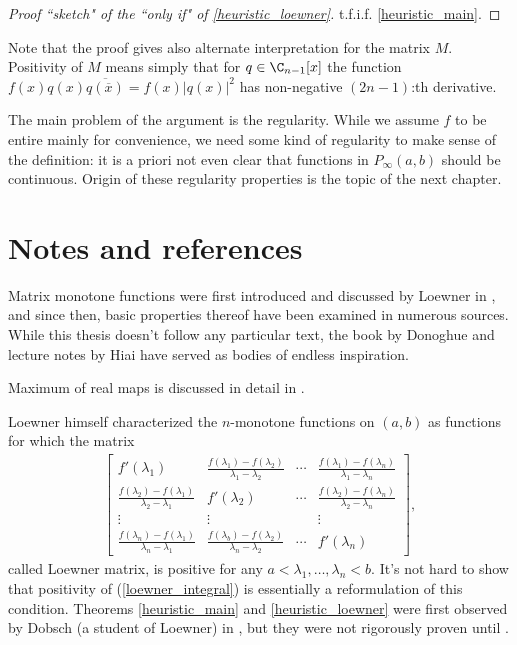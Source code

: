 \begin{proof}[Proof ``sketch" of the ``only if" of \ref{heuristic_loewner}]
	t.f.i.f. \ref{heuristic_main}.
\end{proof}

Note that the proof gives also alternate interpretation for the matrix $M$. Positivity of $M$ means simply that for $q \in \C_{n - 1}[x]$ the function $f(x) q(x) \overline{q(\overline{x})} = f(x) |q(x)|^2$ has non-negative $(2 n - 1)$:th derivative.

The main problem of the argument is the regularity. While we assume $f$ to be entire mainly for convenience, we need some kind of regularity to make sense of the definition: it is a priori not even clear that functions in $P_{\infty}(a, b)$ should be continuous. Origin of these regularity properties is the topic of the next chapter.

\section{Notes and references}

Matrix monotone functions were first introduced and discussed by Loewner in \cite{Low}, and since then, basic properties thereof have been examined in numerous sources. While this thesis doesn't follow any particular text, the book by Donoghue \cite{Don} and lecture notes by Hiai \cite{Hiai} have served as bodies of endless inspiration.

Maximum of real maps is discussed in detail in \cite{Ando2}.

Loewner himself characterized the $n$-monotone functions on $(a, b)$ as functions for which the matrix
\begin{align*}
	\begin{bmatrix}
		f'(\lambda_{1}) & \frac{f(\lambda_{1}) - f(\lambda_{2})}{\lambda_{1} - \lambda_{2}} & \cdots & \frac{f(\lambda_{1}) - f(\lambda_{n})}{\lambda_{1} - \lambda_{n}} \\
		\frac{f(\lambda_{2}) - f(\lambda_{1})}{\lambda_{2} - \lambda_{1}} & f'(\lambda_{2}) & \cdots & \frac{f(\lambda_{2}) - f(\lambda_{n})}{\lambda_{2} - \lambda_{n}} \\
		\vdots & \vdots & & \vdots \\
		\frac{f(\lambda_{n}) - f(\lambda_{1})}{\lambda_{n} - \lambda_{1}} & \frac{f(\lambda_{b}) - f(\lambda_{2})}{\lambda_{n} - \lambda_{2}} & \cdots & f'(\lambda_{n}) 
	\end{bmatrix},
\end{align*}
called Loewner matrix, is positive for any $a < \lambda_{1}, \ldots, \lambda_{n} < b$. It's not hard to show that positivity of (\ref{loewner_integral}) is essentially a reformulation of this condition. Theorems \ref{heuristic_main} and \ref{heuristic_loewner} were first observed by Dobsch (a student of Loewner) in \cite{Dob}, but they were not rigorously proven until \cite{Don}.



